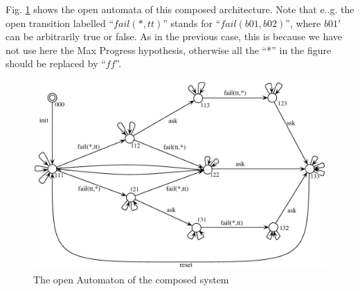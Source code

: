 \documentclass{llncs}
\begin{document}
\bigskip
Fig. \ref{schema:ArchFailure:OA-TimerV4X2} shows the open automata of
this composed architecture.
Note that e..g. the open transition labelled ``$fail(*,tt)$'' stands for
``$fail(b01,b02)$'', where  $b01'$ can be arbitrarily true or
false. As in the previous case, this is because we have not use here
the Max Progress hypothesis, otherwise all the ``*'' in the figure
should be replaced by ``$ff$''.

  \begin{figure}[h]
  \centering
  \includegraphics[width=0.8\columnwidth]{TimerV4X2}
  \caption{The open Automaton of the composed system}
  \label{schema:ArchFailure:OA-TimerV4X2}
\end{figure}
\end{document}
